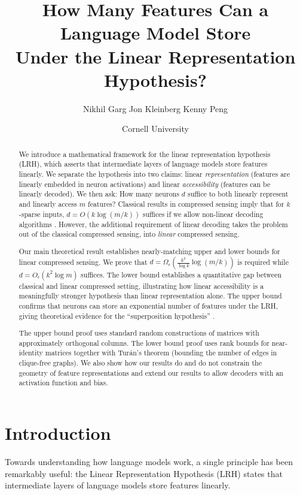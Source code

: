 \documentclass[11pt]{article}
\title{How Many Features Can a Language Model Store\\Under the Linear Representation Hypothesis?}
\author{Nikhil Garg \quad Jon Kleinberg \quad Kenny Peng}
\date{Cornell University}
\begin{document}
\maketitle

\begin{abstract}
    We introduce a mathematical framework for the linear representation hypothesis (LRH), which asserts that intermediate layers of language models store features linearly. We separate the hypothesis into two claims: linear \textit{representation} (features are linearly embedded in neuron activations) and linear \textit{accessibility} (features can be linearly decoded). We then ask: How many neurons $d$ suffice to both linearly represent and linearly access $m$ features? Classical results in compressed sensing imply that for $k$-sparse inputs, $d = O(k\log (m/k))$ suffices if we allow non-linear decoding algorithms  \citep{candes2006near, candes2006robust, donoho2006compressed}. However, the additional requirement of linear decoding takes the problem out of the classical compressed sensing, into \textit{linear} compressed sensing.

    Our main theoretical result establishes nearly-matching upper and lower bounds for linear compressed sensing. We prove that $d = \Omega_\epsilon(\frac{k^2}{\log k}\log (m/k))$ is required while $d = O_\epsilon(k^2\log m)$ suffices. The lower bound establishes a quantitative gap between classical and linear compressed setting, illustrating how linear accessibility is a meaningfully stronger hypothesis than linear representation alone. The upper bound confirms that neurons can store an exponential number of features under the LRH, giving theoretical evidence for the ``superposition hypothesis'' \citep{elhage2022toy}.

    The upper bound proof uses standard random constructions of matrices with approximately orthogonal columns. The lower bound proof uses rank bounds for near-identity matrices \citep{alon2003problems} together with Tur\'an's theorem (bounding the number of edges in clique-free graphs). We also show how our results do and do not constrain the geometry of feature representations and extend our results to allow decoders with an activation function and bias.
\end{abstract}

\section{Introduction}
Towards understanding how language models work, a single principle has been remarkably useful: the Linear Representation Hypothesis (LRH) states that intermediate layers of language models store features linearly. 
\end{document}
